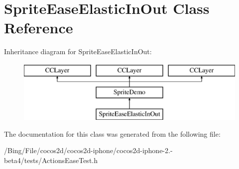 \hypertarget{interface_sprite_ease_elastic_in_out}{\section{Sprite\-Ease\-Elastic\-In\-Out Class Reference}
\label{interface_sprite_ease_elastic_in_out}
}
Inheritance diagram for Sprite\-Ease\-Elastic\-In\-Out\-:\begin{figure}[H]
\begin{center}
\leavevmode
\includegraphics[height=3.000000cm]{interface_sprite_ease_elastic_in_out}
\end{center}
\end{figure}


The documentation for this class was generated from the following file\-:\begin{DoxyCompactItemize}
\item 
/\-Bing/\-File/cocos2d/cocos2d-\/iphone/cocos2d-\/iphone-\/2.-\/beta4/tests/Actions\-Ease\-Test.\-h\end{DoxyCompactItemize}
